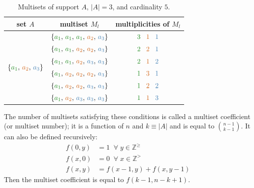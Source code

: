 \documentclass[11pt]{article}
\begin{document}
\begin{table}
  \centering
  \begin{tabular}{| c | c | c |}
    \hline
    \rowcolor{bg} set $A$ & multiset $M_l$ & multiplicities of $M_l$          \\
    \hline
    \multirow{6}{*}{$\{{\color{c1}a_1}, \, {\color{c2}a_2}, \, 
                       {\color{c3}a_3}\}$} 
    & $\{{\color{c1}a_1}, \, {\color{c1}a_1}, \, {\color{c1}a_1}, \, 
         {\color{c2}a_2}, \, {\color{c3}a_3}\}$ 
    & ${\color{c1}3} \;\;\; {\color{c2}1} \;\;\; {\color{c3}1}$               \\
    & $\{{\color{c1}a_1}, \, {\color{c1}a_1}, \, {\color{c2}a_2}, \,
         {\color{c2}a_2}, \, {\color{c3}a_3}\}$ 
    & ${\color{c1}2} \;\;\; {\color{c2}2} \;\;\; {\color{c3}1}$               \\         & $\{{\color{c1}a_1}, \, {\color{c1}a_1}, \, {\color{c2}a_2}, \, 
         {\color{c3}a_3}, \, {\color{c3}a_3}\}$ 
    & ${\color{c1}2} \;\;\; {\color{c2}1} \;\;\; {\color{c3}2}$               \\         & $\{{\color{c1}a_1}, \, {\color{c2}a_2}, \, {\color{c2}a_2}, \, 
         {\color{c2}a_2}, \, {\color{c3}a_3}\}$ 
    & ${\color{c1}1} \;\;\; {\color{c2}3} \;\;\; {\color{c3}1}$               \\
    & $\{{\color{c1}a_1}, \, {\color{c2}a_2}, \, {\color{c2}a_2}, \, 
         {\color{c3}a_3}, \, {\color{c3}a_3}\}$ 
    & ${\color{c1}1} \;\;\; {\color{c2}2} \;\;\; {\color{c3}2}$               \\
    & $\{{\color{c1}a_1}, \, {\color{c2}a_2}, \, {\color{c3}a_3}, \, 
         {\color{c3}a_3}, \, {\color{c3}a_3}\}$ 
    & ${\color{c1}1} \;\;\; {\color{c2}1} \;\;\; {\color{c3}3}$               \\    
    \hline
  \end{tabular}
  \caption{Multisets of support $A$, $|A| = 3$, and cardinality $5$.}
  \label{tab:ex1}
\end{table}  

The number of multisets satisfying these conditions is called a multiset coefficient (or multiset number); it is a function of $n$ and $k \equiv |A|$ and is equal to $\binom{n - 1}{k - 1}$. It can also be defined recursively:
\begin{align*}
  f(0, y) &= 1 \;\; \forall \; y \in \mathbb{Z}^{\geqslant} \\
  f(x, 0) &= 0 \;\; \forall \; x \in \mathbb{Z}^{>} \\
  f(x, y) &= f(x - 1, y) + f(x, y - 1)
\end{align*}
Then the multiset coefficient is equal to $f(k - 1, n - k + 1)$. 
\end{document}
